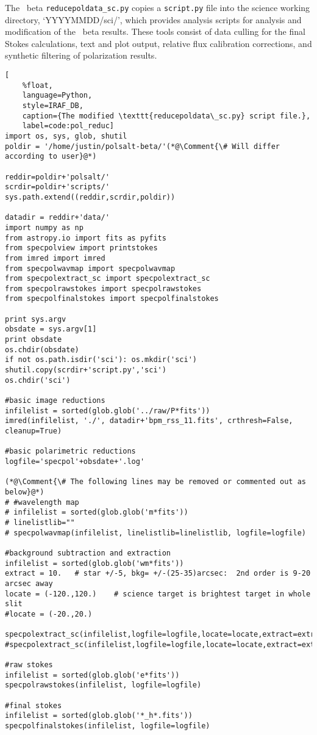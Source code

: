 The \polsalt\ beta \texttt{reducepoldata\_sc.py} copies a \texttt{script.py} file into the science working directory, `YYYYMMDD/sci/', which provides analysis scripts for analysis and modification of the \polsalt\ beta results.
These tools consist of data culling for the final Stokes calculations, text and plot output, relative flux calibration corrections, and synthetic filtering of polarization results.

\newcommand*{\Comment}[1]{\hfill\makebox[7.0cm][l]{#1}}%
\begin{lstlisting}[
    %float,
    language=Python,
    style=IRAF_DB,
    caption={The modified \texttt{reducepoldata\_sc.py} script file.},
    label=code:pol_reduc]
import os, sys, glob, shutil
poldir = '/home/justin/polsalt-beta/'(*@\Comment{\# Will differ according to user}@*)

reddir=poldir+'polsalt/'
scrdir=poldir+'scripts/'
sys.path.extend((reddir,scrdir,poldir))

datadir = reddir+'data/'
import numpy as np
from astropy.io import fits as pyfits
from specpolview import printstokes
from imred import imred
from specpolwavmap import specpolwavmap
from specpolextract_sc import specpolextract_sc
from specpolrawstokes import specpolrawstokes
from specpolfinalstokes import specpolfinalstokes

print sys.argv
obsdate = sys.argv[1]
print obsdate
os.chdir(obsdate)
if not os.path.isdir('sci'): os.mkdir('sci')
shutil.copy(scrdir+'script.py','sci')
os.chdir('sci')

#basic image reductions
infilelist = sorted(glob.glob('../raw/P*fits'))
imred(infilelist, './', datadir+'bpm_rss_11.fits', crthresh=False, cleanup=True)

#basic polarimetric reductions
logfile='specpol'+obsdate+'.log'

(*@\Comment{\# The following lines may be removed or commented out as below}@*)
# #wavelength map
# infilelist = sorted(glob.glob('m*fits'))
# linelistlib=""
# specpolwavmap(infilelist, linelistlib=linelistlib, logfile=logfile)

#background subtraction and extraction
infilelist = sorted(glob.glob('wm*fits'))
extract = 10.   # star +/-5, bkg= +/-(25-35)arcsec:  2nd order is 9-20 arcsec away
locate = (-120.,120.)    # science target is brightest target in whole slit
#locate = (-20.,20.)

specpolextract_sc(infilelist,logfile=logfile,locate=locate,extract=extract)
#specpolextract_sc(infilelist,logfile=logfile,locate=locate,extract=extract,docomp=True,useoldc=True)

#raw stokes
infilelist = sorted(glob.glob('e*fits'))
specpolrawstokes(infilelist, logfile=logfile)

#final stokes
infilelist = sorted(glob.glob('*_h*.fits'))
specpolfinalstokes(infilelist, logfile=logfile)

\end{lstlisting}

